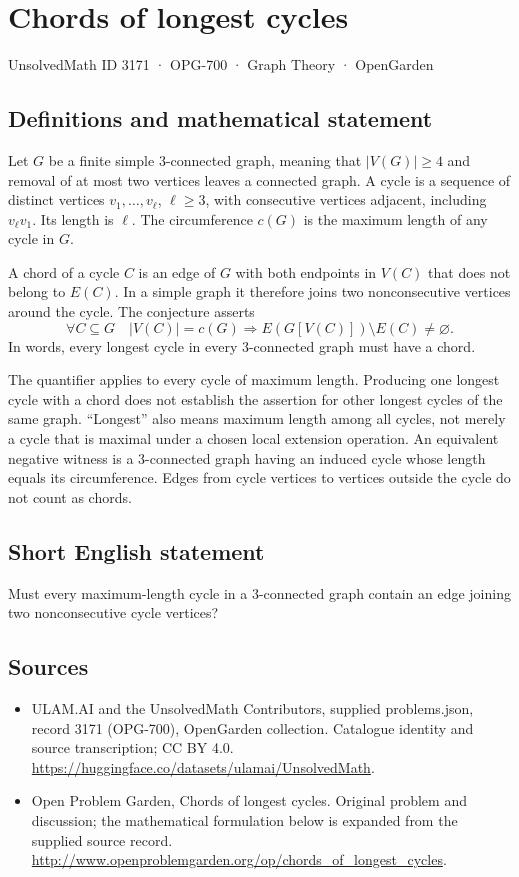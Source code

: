 \documentclass[11pt,a4paper]{article}
\begin{document}
\section*{Chords of longest cycles}\label{3171}
{\small UnsolvedMath ID 3171 · OPG-700 · Graph Theory · OpenGarden}
\subsection{Definitions and mathematical statement}
Let $G$ be a finite simple $3$-connected graph, meaning that
$|V(G)|\geq4$ and removal of at most two vertices leaves a
connected graph. A cycle is a sequence of distinct vertices
$v_1,\ldots,v_\ell$, $\ell\geq3$, with consecutive vertices
adjacent, including $v_\ell v_1$. Its length is $\ell$.
The circumference $c(G)$ is the maximum length of any cycle
in $G$.

A chord of a cycle $C$ is an edge of $G$ with both endpoints
in $V(C)$ that does not belong to $E(C)$. In a simple graph
it therefore joins two nonconsecutive vertices around the
cycle. The conjecture asserts
\[
 \forall C\subseteq G\quad
 |V(C)|=c(G)\Longrightarrow
 E(G[V(C)])\setminus E(C)\neq\varnothing.
\]
In words, every longest cycle in every $3$-connected graph
must have a chord.

The quantifier applies to every cycle of maximum length.
Producing one longest cycle with a chord does not establish
the assertion for other longest cycles of the same graph.
``Longest'' also means maximum length among all cycles,
not merely a cycle that is maximal under a chosen local
extension operation. An equivalent negative witness is a
$3$-connected graph having an induced cycle whose length
equals its circumference. Edges from cycle vertices to
vertices outside the cycle do not count as chords.
\subsection{Short English statement}
Must every maximum-length cycle in a 3-connected graph contain an edge joining two nonconsecutive cycle vertices?
\subsection{Sources}
\begin{itemize}
\item[S1] ULAM.AI and the UnsolvedMath Contributors, supplied problems.json, record 3171 (OPG-700), OpenGarden collection. Catalogue identity and source transcription; CC BY 4.0.
\url{https://huggingface.co/datasets/ulamai/UnsolvedMath}.
\item[S2] Open Problem Garden, Chords of longest cycles. Original problem and discussion; the mathematical formulation below is expanded from the supplied source record.
\url{http://www.openproblemgarden.org/op/chords_of_longest_cycles}.
\end{itemize}
\end{document}
